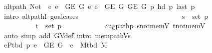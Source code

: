 \begin{isabellebody}
\ {\isachardoublequoteopen}alt{\isacharunderscore}{\kern0pt}path\ {\isacharparenleft}{\kern0pt}Not\ {\isasymcirc}\ {\isacharparenleft}{\kern0pt}{\isasymlambda}e{\isachardot}{\kern0pt}\ e\ {\isasymin}\ G{\isachardot}{\kern0pt}E\ {\isacharquery}{\kern0pt}G{}{\isacharparenright}{\kern0pt}{\isacharparenright}{\kern0pt}\ {\isacharparenleft}{\kern0pt}{\isasymlambda}e{\isachardot}{\kern0pt}\ e\ {\isasymin}\ G{\isachardot}{\kern0pt}E\ {\isacharquery}{\kern0pt}G{}{\isacharparenright}{\kern0pt}\ {\isacharparenleft}{\kern0pt}G{\isachardot}{\kern0pt}E\ {\isacharquery}{\kern0pt}G{\isacharparenright}{\kern0pt}\ p{\isacharprime}{\kern0pt}\ {\isacharparenleft}{\kern0pt}hd\ p{\isacharprime}{\kern0pt}{\isacharparenright}{\kern0pt}\ {\isacharparenleft}{\kern0pt}last\ p{\isacharprime}{\kern0pt}{\isacharparenright}{\kern0pt}{\isachardoublequoteclose}\isanewline
\ \ \ \ \ \ \isamarkupfalse%
\ {\isacharparenleft}{\kern0pt}intro\ alt{\isacharunderscore}{\kern0pt}pathI{\isacharcomma}{\kern0pt}\ goal{\isacharunderscore}{\kern0pt}cases{\isacharparenright}{\kern0pt}\isanewline
\ \ \ \ \ \ \ \ \isamarkupfalse%
\ {}\isanewline
\ \ \ \ \ \ \ \ \isamarkupfalse%
\isanewline
\ \ \ \ \ \ \ \ \ \ {\isachardoublequoteopen}s\ {\isasymnotin}\ set\ p{\isacharprime}{\kern0pt}{\isachardoublequoteclose}\isanewline
\ \ \ \ \ \ \ \ \ \ {\isachardoublequoteopen}t\ {\isasymnotin}\ set\ p{\isacharprime}{\kern0pt}{\isachardoublequoteclose}\isanewline
\ \ \ \ \ \ \ \ \ \ \isamarkupfalse%
\ augpath{\isacharunderscore}{\kern0pt}p{\isacharprime}{\kern0pt}\ s{\isacharunderscore}{\kern0pt}not{\isacharunderscore}{\kern0pt}mem{\isacharunderscore}{\kern0pt}V\ t{\isacharunderscore}{\kern0pt}not{\isacharunderscore}{\kern0pt}mem{\isacharunderscore}{\kern0pt}V\isanewline
\ \ \ \ \ \ \ \ \ \ \isamarkupfalse%
\ {\isacharparenleft}{\kern0pt}auto\ simp\ add{\isacharcolon}{\kern0pt}\ G{\isachardot}{\kern0pt}V{\isacharunderscore}{\kern0pt}def\ intro{\isacharcolon}{\kern0pt}\ mem{\isacharunderscore}{\kern0pt}path{\isacharunderscore}{\kern0pt}Vs{\isacharparenright}{\kern0pt}\isanewline
\ \ \ \ \ \ \ \ \isamarkupfalse%
\ {\isachardoublequoteopen}{\isasymforall}e{\isasymin}P{\isacharunderscore}{\kern0pt}tbd\ p{\isacharprime}{\kern0pt}{\isachardot}{\kern0pt}\ e\ {\isasymin}\ G{\isachardot}{\kern0pt}E\ {\isacharquery}{\kern0pt}G{}\ {\isasymlongleftrightarrow}\ e\ {\isasymin}\ M{\isacharunderscore}{\kern0pt}tbd\ M{\isachardoublequoteclose}\isanewline
\ \ \ \ \ \ \ \ \ \ \isamarkupfalse%

\end{isabellebody}
